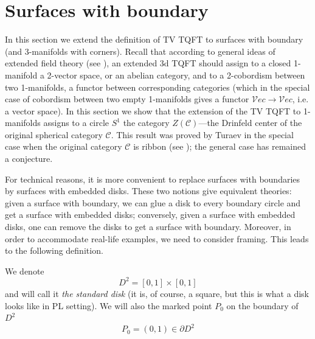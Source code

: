 \documentclass{amsart}
\theoremstyle{definition}
\theoremstyle{remark}
\numberwithin{equation}{section}
\newcommand{\del}{\partial}
\newcommand{\<}{\langle}
\renewcommand{\>}{\rangle}
\newcommand{\C}{\mathcal{C}}      %
\newcommand{\Vect}{\mathcal{V}ec}  %
\begin{document}
\section{Surfaces with boundary}\label{s:boundary}

In this section we extend the definition of TV TQFT to surfaces with
boundary (and 3-manifolds with corners). Recall that according to general
ideas of extended field theory (see ), an extended 3d 
TQFT should assign to a closed 1-manifold a 2-vector space, or an abelian
category, and to a 2-cobordism between two 1-manifolds, a functor between
corresponding categories (which in the special case of cobordism between
two empty 1-manifolds gives a functor $\Vect\to \Vect$, i.e. a  vector
space). In this section we show that the extension of the  TV TQFT to
1-manifolds assigns to a circle $S^1$ the category $Z(\C)$---the Drinfeld
center of the original spherical category $\C$. This result was
proved by Turaev in the special case when the original category $\C$ is
ribbon (see ); the general case has remained a
conjecture.


For technical reasons, it is more convenient to replace surfaces with
boundaries by surfaces with embedded disks. These two notions give
equivalent theories: given a surface with boundary, we can glue a disk to
every boundary circle and get a surface with embedded disks; conversely,
given a surface with embedded disks, one can remove the disks to get  a
surface with boundary. Moreover, in order to accommodate real-life
examples, we need to consider framing. This leads to the following
definition.

We denote
$$
D^2=[0,1]\times[0,1]
$$
and will call it {\em the standard disk} (it is, of course, a square, but
this is what a disk looks like in PL setting). We will also the marked
point $P_0$ on the boundary of $D^2$
$$
P_0=(0,1)\in \del D^2
$$
% 
\end{document}
